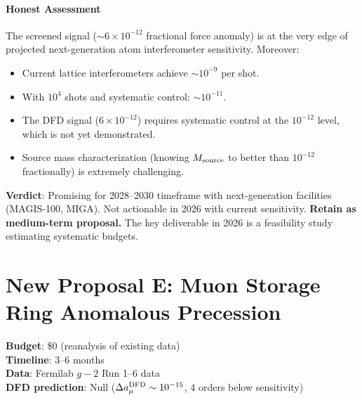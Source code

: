 \documentclass[11pt]{article}
\newcommand{\ee}[1]{\times 10^{#1}}
\begin{document}
\subsection{Honest Assessment}

The screened signal ($\sim 6\ee{-12}$ fractional force anomaly) is
at the very edge of projected next-generation atom interferometer
sensitivity. Moreover:
\begin{itemize}[nosep]
\item Current lattice interferometers achieve $\sim 10^{-9}$ per shot.
\item With $10^4$ shots and systematic control: $\sim 10^{-11}$.
\item The DFD signal ($6\ee{-12}$) requires systematic control at
  the $10^{-12}$ level, which is not yet demonstrated.
\item Source mass characterization (knowing $M_{\rm source}$ to better
  than $10^{-12}$ fractionally) is extremely challenging.
\end{itemize}

\textbf{Verdict}: Promising for 2028--2030 timeframe with next-generation
facilities (MAGIS-100, MIGA). Not actionable in 2026 with current
sensitivity. \textbf{Retain as medium-term proposal.} The key deliverable
in 2026 is a feasibility study estimating systematic budgets.


\part{New Proposal E: Muon Storage Ring Anomalous Precession}
\label{part:muon}

\begin{tcolorbox}[colback=purple!3!white, colframe=newcolor,
  title=\textbf{NEW PROPOSAL E --- MUON $g{-}2$ STORAGE RING REINTERPRETATION}]
\textbf{Budget}: \$0 (reanalysis of existing data)\\
\textbf{Timeline}: 3--6 months\\
\textbf{Data}: Fermilab $g{-}2$ Run 1--6 data\\
\textbf{DFD prediction}: Null ($\Delta a_\mu^{\rm DFD} \sim 10^{-15}$,
4 orders below sensitivity)
\end{tcolorbox}
\end{document}
